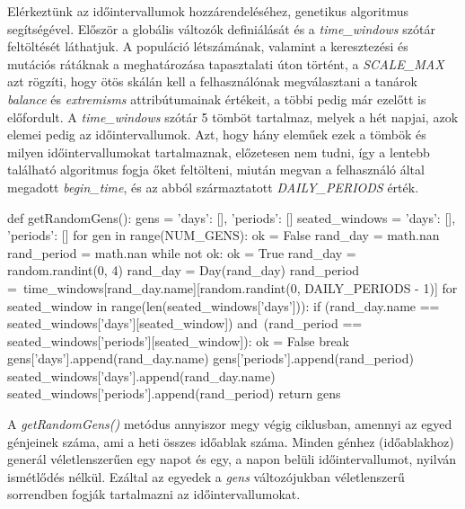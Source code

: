 Elérkeztünk az időintervallumok hozzárendeléséhez, genetikus algoritmus segítségével. Először a globális változók definiálását és a \textit{time\_windows} szótár feltöltését láthatjuk. A populáció létszámának, valamint a keresztezési és mutációs rátáknak a meghatározása tapasztalati úton történt, a \textit{SCALE\_MAX} azt rögzíti, hogy ötös skálán kell a felhasználónak megválasztani a tanárok \textit{balance} és \textit{extremisms} attribútumainak értékeit, a többi pedig már ezelőtt is előfordult. A \textit{time\_windows} szótár 5 tömböt tartalmaz, melyek a hét napjai, azok elemei pedig az időintervallumok. Azt, hogy hány eleműek ezek a tömbök és milyen időintervallumokat tartalmaznak, előzetesen nem tudni, így a lentebb található algoritmus fogja őket feltölteni, miután megvan a felhasználó által megadott \textit{begin\_time}, és az abból származtatott \textit{DAILY\_PERIODS} érték.

\begin{python}
def getRandomGens():
    gens = {'days': [], 'periods': []}
    seated_windows = {'days': [], 'periods': []}
    for gen in range(NUM_GENS):
        ok = False
        rand_day = math.nan
        rand_period = math.nan
        while not ok:
            ok = True
            rand_day = random.randint(0, 4)
            rand_day = Day(rand_day)
            rand_period =\
                time_windows[rand_day.name][random.randint(0, 
                DAILY_PERIODS - 1)]
            for seated_window in range(len(seated_windows['days'])):
                if (rand_day.name ==
                   seated_windows['days'][seated_window]) and\
                   (rand_period == 
                   seated_windows['periods'][seated_window]):
                    ok = False
                    break
        gens['days'].append(rand_day.name)
        gens['periods'].append(rand_period)
        seated_windows['days'].append(rand_day.name)
        seated_windows['periods'].append(rand_period)
    return gens
\end{python}

A \textit{getRandomGens()} metódus annyiszor megy végig ciklusban, amennyi az egyed génjeinek száma, ami a heti összes időablak száma. Minden génhez (időablakhoz) generál véletlenszerűen egy napot és egy, a napon belüli időintervallumot, nyilván ismétlődés nélkül. Ezáltal az egyedek a \textit{gens} változójukban véletlenszerű sorrendben fogják tartalmazni az időintervallumokat.

